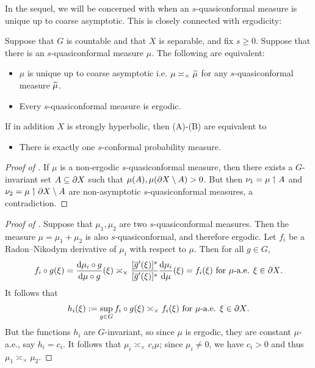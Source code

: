 In the sequel, we will be concerned with when an $s$-quasiconformal measure is unique up to coarse asymptotic. This is closely connected with ergodicity:
\begin{proposition}
\label{propositionquasiconformaluniqueness}
Suppose that $G$ is countable and that $X$ is separable, and fix $s\geq 0$. Suppose that there is an $s$-quasiconformal measure $\mu$. The following are equivalent:
\begin{itemize}
\item[(A)] $\mu$ is unique up to coarse asymptotic i.e. $\mu\asymp_\times \widetilde\mu$ for any $s$-quasiconformal measure $\widetilde\mu$.
\item[(B)] Every $s$-quasiconformal measure is ergodic.
\end{itemize}
If in addition $X$ is strongly hyperbolic, then (A)-(B) are equivalent to
\begin{itemize}
\item[(C)] There is exactly one $s$-conformal probability measure.
\end{itemize}
\end{proposition}
\begin{proof}[Proof of ]
If $\mu$ is a non-ergodic $s$-quasiconformal measure, then there exists a $G$-invariant set $A\subseteq\partial X$ such that $\mu(A),\mu(\partial X\setminus A) > 0$. But then $\nu_1 = \mu\upharpoonleft A$ and $\nu_2 = \mu\upharpoonleft\partial X\setminus A$ are non-asymptotic $s$-quasiconformal measures, a contradiction.
\end{proof}
\begin{proof}[Proof of ]
Suppose that $\mu_1,\mu_2$ are two $s$-quasiconformal measures. Then the measure $\mu = \mu_1 + \mu_2$ is also $s$-quasiconformal, and therefore ergodic. Let $f_i$ be a Radon--Nikodym derivative of $\mu_i$ with respect to $\mu$. Then for all $g\in G$,
\begin{equation}
\label{fiinvariant}
f_i \circ g(\xi) = \frac{\mathrm{d} \mu_i\circ g}{\mathrm{d} \mu\circ g}(\xi) \asymp_\times \frac{[\overline g'(\xi)]^s}{[\overline g'(\xi)]^s} \frac{\mathrm{d}\mu_i}{\mathrm{d}\mu}(\xi) = f_i(\xi) \textup{ for $\mu$-a.e. $\xi\in\partial X$}.
\end{equation}
It follows that
\[
h_i(\xi) := \sup_{g\in G} f_i\circ g(\xi) \asymp_\times f_i(\xi) \textup{ for $\mu$-a.e. $\xi\in\partial X$}.
\]
But the functions $h_i$ are $G$-invariant, so since $\mu$ is ergodic, they are constant $\mu$-a.e., say $h_i = c_i$. It follows that $\mu_i \asymp_\times c_i \mu$; since $\mu_i \neq 0$, we have $c_i > 0$ and thus $\mu_1\asymp_\times \mu_2$.
\end{proof}
